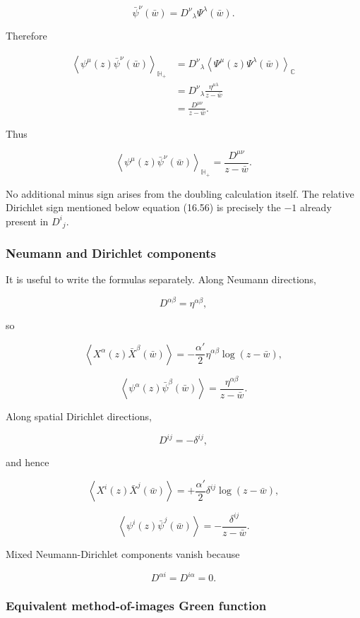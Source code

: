 \documentclass[
  10pt,
  a4paper,
  openany]{book}
\begin{document}
\[
\bar\psi^\nu(\bar w)
=D^\nu{}_\lambda\Psi^\lambda(\bar w).
\]

Therefore

\[
\begin{aligned}
\left\langle\psi^\mu(z)\bar\psi^\nu(\bar w)\right\rangle_{\mathbb H_+}
&=D^\nu{}_\lambda
\left\langle\Psi^\mu(z)\Psi^\lambda(\bar w)\right\rangle_{\mathbb C}\\
&=D^\nu{}_\lambda
\frac{\eta^{\mu\lambda}}{z-\bar w}\\
&=\frac{D^{\mu\nu}}{z-\bar w}.
\end{aligned}
\]

Thus

\[
\boxed{
\left\langle\psi^\mu(z)\bar\psi^\nu(\bar w)\right\rangle_{\mathbb H_+}
=\frac{D^{\mu\nu}}{z-\bar w}.
}
\]

No additional minus sign arises from the doubling calculation itself.
The relative Dirichlet sign mentioned below equation (16.56) is
precisely the \(-1\) already present in \(D^i{}_j\).

\subsubsection{Neumann and Dirichlet
components}\label{neumann-and-dirichlet-components}

It is useful to write the formulas separately. Along Neumann directions,

\[
D^{\alpha\beta}=\eta^{\alpha\beta},
\]

so

\[
\boxed{
\left\langle X^\alpha(z)\bar X^\beta(\bar w)\right\rangle
=-\frac{\alpha'}2\eta^{\alpha\beta}\log(z-\bar w),
}
\]

\[
\boxed{
\left\langle\psi^\alpha(z)\bar\psi^\beta(\bar w)\right\rangle
=\frac{\eta^{\alpha\beta}}{z-\bar w}.
}
\]

Along spatial Dirichlet directions,

\[
D^{ij}=-\delta^{ij},
\]

and hence

\[
\boxed{
\left\langle X^i(z)\bar X^j(\bar w)\right\rangle
=+\frac{\alpha'}2\delta^{ij}\log(z-\bar w),
}
\]

\[
\boxed{
\left\langle\psi^i(z)\bar\psi^j(\bar w)\right\rangle
=-\frac{\delta^{ij}}{z-\bar w}.
}
\]

Mixed Neumann-Dirichlet components vanish because

\[
D^{\alpha i}=D^{i\alpha}=0.
\]

\subsubsection{Equivalent method-of-images Green
function}\label{equivalent-method-of-images-green-function}
\end{document}
